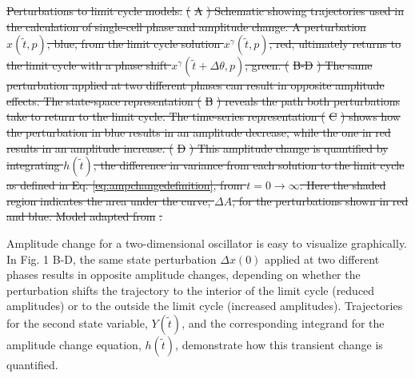 \documentclass[11pt, letterpaper]{article}
\providecommand{\DIFdel}[1]{{\protect\color{red}\sout{#1}}}                      %
\providecommand{\DIFdelend}{} %
\begin{document}
{%
\DIFdel{Perturbations to limit cycle models.}%
\DIFdel{(}%
\DIFdel{A}%
\DIFdel{)
  Schematic showing trajectories used in the calculation of single-cell phase
  and amplitude change. A perturbation $x(\tilde{t},p)$, blue, from the limit
  cycle solution $x^\gamma(\tilde{t},p)$, red, ultimately returns to the limit
  cycle with a phase shift $x^\gamma(\tilde{t} + \Delta\theta,p)$, green.
  (}%
\DIFdel{B-D}%
\DIFdel{) The same perturbation applied at two different phases can
  result in opposite amplitude effects. The state-space representation
  (}%
\DIFdel{B}%
\DIFdel{) reveals the path both perturbations take to return to the
  limit cycle. The time-series representation (}%
\DIFdel{C}%
\DIFdel{) shows how the
  perturbation in blue results in an amplitude decrease, while the one in red
  results in an amplitude increase. (}%
\DIFdel{D}%
\DIFdel{) This amplitude change is
  quantified by integrating $h(\tilde{t})$, the difference in variance from
  each solution to the limit cycle as defined in Eq.
  \ref{eq:ampchangedefinition}, from $t=0 \to \infty$. Here the shaded
  region indicates the area under the curve, $\Delta A$, for the perturbations
  shown in red and blue. Model adapted from }%
\DIFdel{.}}

\DIFdelend Amplitude change for a two-dimensional oscillator is easy to visualize
graphically. In Fig. 1 B-D, the same state perturbation $\Delta x(0)$ applied at
two different phases results in opposite amplitude changes, depending on whether
the perturbation shifts the trajectory to the interior of the limit cycle
(reduced amplitudes) or to the outside the limit cycle (increased amplitudes).
Trajectories for the second state variable, $Y(\tilde{t})$, and the
corresponding integrand for the amplitude change equation, $h(\tilde{t})$,
demonstrate how this transient change is quantified. 
\end{document}

